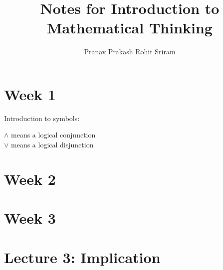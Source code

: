 \documentclass[]{article}
\begin{document}
\title{Notes for Introduction to Mathematical Thinking}
\author{Pranav Prakash \cr Rohit Sriram}
\maketitle

\section{Week 1}

Introduction to symbols:

\begin{center}

\begin{framed}
	$\wedge$ means a logical conjunction \\
 	$\vee$ means a logical disjunction
\end{framed}

\end{center}


\section{Week 2}

\section{Week 3}
	\section{Lecture 3: Implication}
	
\end{document}
